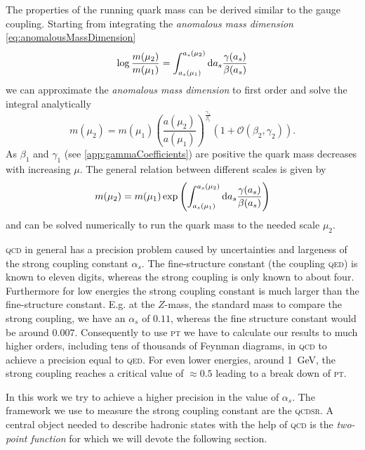 \documentclass[../../index.tex]{subfiles}
\begin{document}
The properties of the running quark mass can be derived similar to the gauge
coupling. Starting from integrating the \textit{anomalous mass dimension}
\cref{eq:anomalousMassDimension}
\begin{equation}
  \log \frac{m(\mu_2)}{m(\mu_1)} = \int_{a_s(\mu_1)}^{a_s(\mu_2)} \dif a_s \frac{\gamma(a_s)}{\beta(a_s)}
\end{equation}
we can approximate the \textit{anomalous mass dimension} to first order and
solve the integral analytically \cite{Schwab2002}
\begin{equation}
  m(\mu_2) = m(\mu_1)\left( \frac{a(\mu_2)}{a(\mu_1)} \right)^{\frac{\gamma_1}{\beta_1}} \left( 1 + \mathcal{O}(\beta_2, \gamma_2) \right).
\end{equation}
As $\beta_1$ and $\gamma_1$ (see \ref{app:gammaCoefficients}) are positive the
quark mass decreases with increasing $\mu$. The general relation between
different scales is given by
\begin{equation}
  m(\mu_2) = m(\mu_1) \exp \left( \int_{a_s(\mu_1)}^{a_s(\mu_2)} \dif a_s \frac{\gamma(a_s)}{\beta(a_s)}  \right)
\end{equation}
and can be solved numerically to run the quark mass to the needed scale $\mu_2$.

\textsc{qcd} in general has a precision problem caused by uncertainties and
largeness of the strong coupling constant $\alpha_s$. The fine-structure
constant (the coupling \textsc{qed}) is known to eleven digits, whereas the
strong coupling is only known to about four. Furthermore for low energies the
strong coupling constant is much larger than the fine-structure constant. E.g.
at the $Z$-mass, the standard mass to compare the strong coupling, we have an
$\alpha_s$ of $0.11$, whereas the fine structure constant would be around
$0.007$. Consequently to use \textsc{pt} we have to calculate our results to
much higher orders, including tens of thousands of Feynman diagrams, in
\textsc{qcd} to achieve a precision equal to \textsc{qed}. For even lower
energies, around \SI{1}{\giga\eV}, the strong coupling reaches a critical value
of $\approx 0.5$ leading to a break down of \textsc{pt}.

In this work we try to achieve a higher precision in the value of $\alpha_s$.
The framework we use to measure the strong coupling constant are the
\textsc{qcdsr}. A central object needed to describe hadronic states with the
help of \textsc{qcd} is the \textit{two-point function} for which we will devote the
following section.
\end{document}
